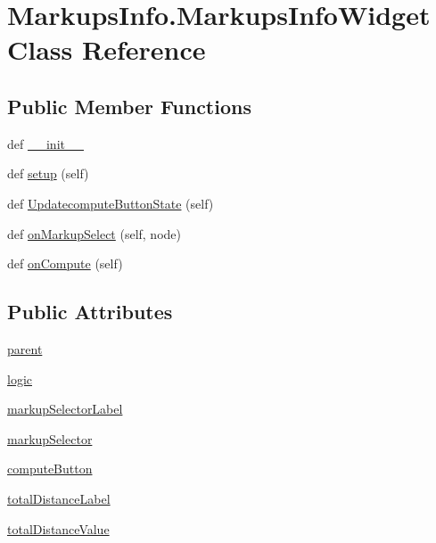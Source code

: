 \hypertarget{class_markups_info_1_1_markups_info_widget}{}\section{Markups\+Info.\+Markups\+Info\+Widget Class Reference}
\label{class_markups_info_1_1_markups_info_widget}
\subsection*{Public Member Functions}
\begin{DoxyCompactItemize}
\item 
def \hyperlink{class_markups_info_1_1_markups_info_widget_a8231d2418ff192e62e62361b62358568}{\+\_\+\+\_\+init\+\_\+\+\_\+}
\item 
def \hyperlink{class_markups_info_1_1_markups_info_widget_adca013554e00da47c992ce8df6ca530b}{setup} (self)
\item 
def \hyperlink{class_markups_info_1_1_markups_info_widget_a11cd87de1fc9227e6d72092c3acb6787}{Updatecompute\+Button\+State} (self)
\item 
def \hyperlink{class_markups_info_1_1_markups_info_widget_a723ba32aeb870784b2beeffa387fa500}{on\+Markup\+Select} (self, node)
\item 
def \hyperlink{class_markups_info_1_1_markups_info_widget_acf36666a3ce7e86e2d4e433f4ddc8560}{on\+Compute} (self)
\end{DoxyCompactItemize}
\subsection*{Public Attributes}
\begin{DoxyCompactItemize}
\item 
\hyperlink{class_markups_info_1_1_markups_info_widget_ad3681dfadf34f6b646e092e626c02269}{parent}
\item 
\hyperlink{class_markups_info_1_1_markups_info_widget_a90719607e3574542aef2f4fbc8b38694}{logic}
\item 
\hyperlink{class_markups_info_1_1_markups_info_widget_ac603f15c61bd6cb65c949f2f7d151c17}{markup\+Selector\+Label}
\item 
\hyperlink{class_markups_info_1_1_markups_info_widget_aa3adfbb4f342bf9e3063613cf29c6808}{markup\+Selector}
\item 
\hyperlink{class_markups_info_1_1_markups_info_widget_a7ed23a4ba5f19534f7addab2d8d0a63f}{compute\+Button}
\item 
\hyperlink{class_markups_info_1_1_markups_info_widget_af5845a2231b4de465af8658e1e5039df}{total\+Distance\+Label}
\item 
\hyperlink{class_markups_info_1_1_markups_info_widget_ac2b547cb4aadcf3f29c37392d3f0d8b8}{total\+Distance\+Value}
\end{DoxyCompactItemize}


